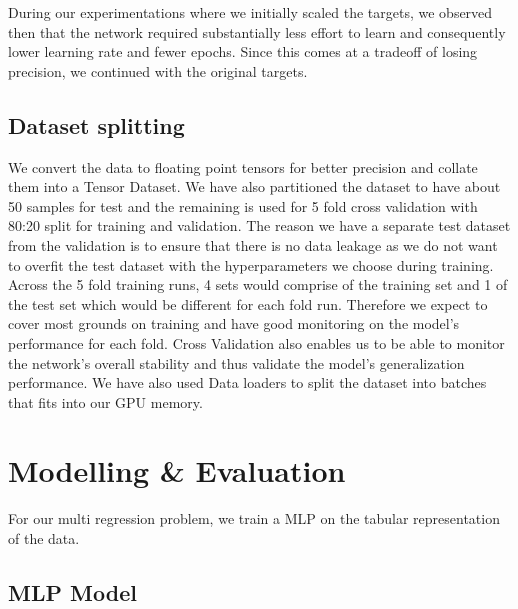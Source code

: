 \documentclass{report} %
\begin{document}
During our experimentations where we initially scaled the targets, we observed then that the network required substantially less effort to learn and consequently lower learning rate and fewer epochs.
Since this comes at a tradeoff of losing precision, we continued with the original targets.

\section{Dataset splitting}\label{sec:Dataset splitting}
We convert the data to floating point tensors for better precision and collate them into a Tensor Dataset.
We have also partitioned the dataset to have about 50 samples for test and the remaining is used for 5 fold cross validation with 80:20 split for training and validation. 
The reason we have a separate test dataset from the validation is to ensure that there is no data leakage as we do not want to 
overfit the test dataset with the hyperparameters we choose during training. 
Across the 5 fold training runs, 4 sets would comprise of the training set and 1 of the test set which would be different for each fold run.
Therefore we expect to cover most grounds on training and have good monitoring on the model's performance for each fold.
Cross Validation also enables us to be able to monitor the network's overall stability and thus validate the model's generalization performance.
We have also used Data loaders to split the dataset into batches that fits into our \ac{GPU} memory.

\chapter{Modelling \& Evaluation}

For our multi regression problem, we train a \ac{MLP} on the tabular representation of the data.

\section{\ac{MLP} Model}\label{sec:MLP Model}

\end{document}
